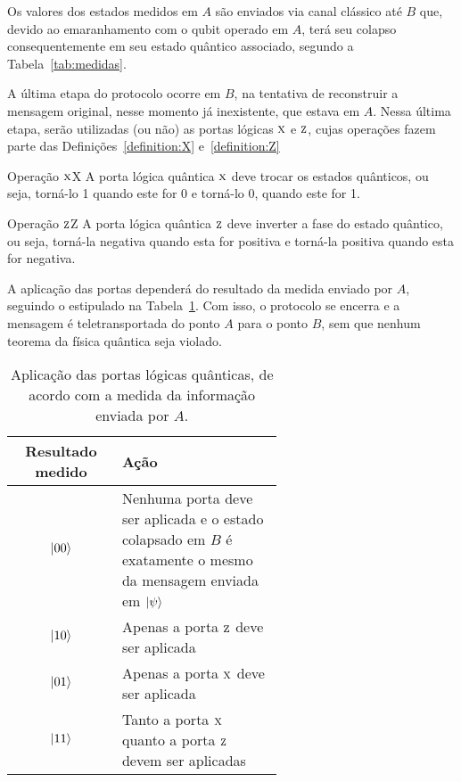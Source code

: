 Os valores dos estados medidos em \(A\) são enviados via canal clássico até \(B\) que, devido ao emaranhamento com o qubit operado em \(A\), terá seu colapso consequentemente em seu estado quântico associado, segundo a Tabela~\ref{tab:medidas}.

A última etapa do protocolo ocorre em \(B\), na tentativa de reconstruir a mensagem original, nesse momento já inexistente, que estava em \(A\). Nessa última etapa, serão utilizadas (ou não) as portas lógicas \(\operatorname{\textsc{x}}\) e \(\operatorname{\textsc{z}}\), cujas operações fazem parte das Definições~\ref{definition:X} e~\ref{definition:Z}

\begin{definition}{Operação \(\operatorname{\textsc{x}}\)}{X}
A porta lógica quântica \(\operatorname{\textsc{x}}\) deve trocar os estados quânticos, ou seja, torná-lo 1 quando este for 0 e torná-lo 0, quando este for 1.
\end{definition}

\begin{definition}{Operação \(\operatorname{\textsc{z}}\)}{Z}
A porta lógica quântica \(\operatorname{\textsc{z}}\) deve inverter a fase do estado quântico, ou seja, torná-la negativa quando esta for positiva e torná-la positiva quando esta for negativa.
\end{definition}

A aplicação das portas dependerá do resultado da medida enviado por \(A\), seguindo o estipulado na Tabela~\ref{tab:acao-das-portas}. Com isso, o protocolo se encerra e a mensagem é teletransportada do ponto \(A\) para o ponto \(B\), sem que nenhum teorema da física quântica seja violado.

\begin{table}[ht!]
  \centering
  \caption{Aplicação das portas lógicas quânticas, de acordo com a medida da informação enviada por \(A\).}\label{tab:acao-das-portas}
  \begin{tabular}{cp{0.6\linewidth}}
    \toprule
    Resultado medido & Ação \\
    \midrule
    $\ket{00}$ & Nenhuma porta deve ser aplicada e o estado colapsado em \(B\) é exatamente o mesmo da mensagem enviada em $\ket{\psi}$ \\
    $\ket{10}$ & Apenas a porta \(\operatorname{\textsc{z}}\) deve ser aplicada \\
    $\ket{01}$ & Apenas a porta \(\operatorname{\textsc{x}}\) deve ser aplicada \\
    $\ket{11}$ & Tanto a porta \(\operatorname{\textsc{x}}\) quanto a porta \(\operatorname{\textsc{z}}\) devem ser aplicadas \\
    \bottomrule
  \end{tabular}
\end{table}


